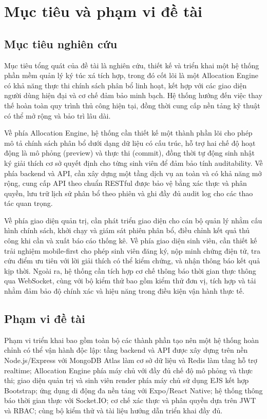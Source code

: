 \documentclass[../DoAn.tex]{subfiles}
\begin{document}
\section{Mục tiêu và phạm vi đề tài}
\label{section:1.2}

\subsection{Mục tiêu nghiên cứu}

Mục tiêu tổng quát của đề tài là nghiên cứu, thiết kế và triển khai một hệ
thống phần mềm quản lý ký túc xá tích hợp, trong đó cốt lõi là một Allocation
Engine có khả năng thực thi chính sách phân bổ linh hoạt, kết hợp với các giao
diện người dùng hiện đại và cơ chế đảm bảo minh bạch. Hệ thống hướng đến việc
thay thế hoàn toàn quy trình thủ công hiện tại, đồng thời cung cấp nền tảng kỹ
thuật có thể mở rộng và bảo trì lâu dài.

Về phía Allocation Engine, hệ thống cần thiết kế một thành phần lõi cho phép
mô tả chính sách phân bổ dưới dạng dữ liệu có cấu trúc, hỗ trợ hai chế độ
hoạt động là mô phỏng (preview) và thực thi (commit), đồng thời tự động sinh
nhật ký giải thích cơ sở quyết định cho từng sinh viên để đảm bảo tính
auditability. Về phía backend và API, cần xây dựng một tầng dịch vụ an toàn và
có khả năng mở rộng, cung cấp API theo chuẩn RESTful được bảo vệ bằng xác thực
và phân quyền, lưu trữ lịch sử phân bổ theo phiên và ghi đầy đủ audit log cho
các thao tác quan trọng.

Về phía giao diện quản trị, cần phát triển giao diện cho cán bộ quản lý nhằm
cấu hình chính sách, khởi chạy và giám sát phiên phân bổ, điều chỉnh kết quả
thủ công khi cần và xuất báo cáo thống kê. Về phía giao diện sinh viên, cần
thiết kế trải nghiệm mobile-first cho phép sinh viên đăng ký, nộp minh chứng
điện tử, tra cứu điểm ưu tiên với lời giải thích có thể kiểm chứng, và nhận
thông báo kết quả kịp thời. Ngoài ra, hệ thống cần tích hợp cơ chế thông báo
thời gian thực thông qua WebSocket, cùng với bộ kiểm thử bao gồm kiểm thử đơn
vị, tích hợp và tải nhằm đảm bảo độ chính xác và hiệu năng trong điều kiện vận
hành thực tế.

\subsection{Phạm vi đề tài}

Phạm vi triển khai bao gồm toàn bộ các thành phần tạo nên một hệ thống hoàn
chỉnh có thể vận hành độc lập: tầng backend và API được xây dựng trên nền
Node.js/Express với MongoDB Atlas làm cơ sở dữ liệu và Redis làm tầng hỗ trợ
realtime; Allocation Engine phía máy chủ với đầy đủ chế độ mô phỏng và thực
thi; giao diện quản trị và sinh viên render phía máy chủ sử dụng EJS kết hợp
Bootstrap; ứng dụng di động đa nền tảng với Expo/React Native; hệ thống thông
báo thời gian thực với Socket.IO; cơ chế xác thực và phân quyền dựa trên JWT
và RBAC; cùng bộ kiểm thử và tài liệu hướng dẫn triển khai đầy đủ.
\end{document}

